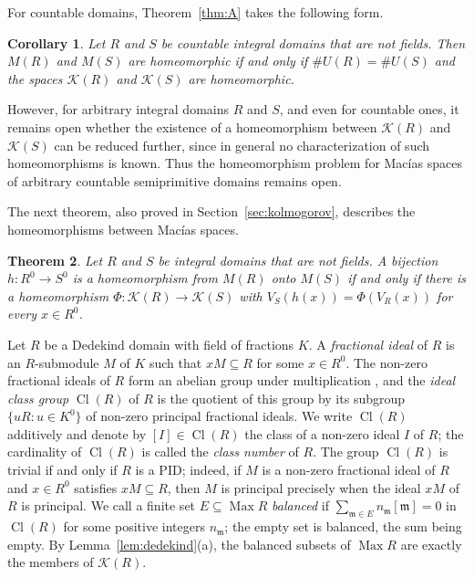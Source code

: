 \documentclass[12pt,reqno,a4paper]{amsart}
\newcommand{\K}{\mathcal{K}}
\newcommand{\m}{\mathfrak{m}}
\DeclareMathOperator{\Max}{Max}
\DeclareMathOperator{\Cl}{Cl}
\theoremstyle{plain}
\newtheorem{theorem}{Theorem}[section]
\newtheorem{corollary}[theorem]{Corollary}
\theoremstyle{definition}
\begin{document}
For countable domains, Theorem~\ref{thm:A} takes the following form.

\begin{corollary}\label{cor:countableK}
Let $R$ and $S$ be countable integral domains that are not fields. Then $M(R)$ and $M(S)$ are homeomorphic if and only if $\#U(R)=\#U(S)$ and the spaces $\K(R)$ and $\K(S)$ are homeomorphic.
\end{corollary}

However, for arbitrary integral domains $R$ and $S$, and even for countable ones, it remains open whether the existence of a homeomorphism between $\K(R)$ and $\K(S)$ can be reduced further, since in general no characterization of such homeomorphisms is known. Thus the homeomorphism problem for Mac\'ias spaces of arbitrary countable semiprimitive domains remains open.

The next theorem, also proved in Section~\ref{sec:kolmogorov}, describes the homeomorphisms between Mac\'ias spaces.

\begin{theorem}\label{cor:homeo}
Let $R$ and $S$ be integral domains that are not fields. A bijection $h\colon R^0\to S^0$ is a homeomorphism from $M(R)$ onto $M(S)$ if and only if there is a homeomorphism $\Phi\colon\K(R)\to\K(S)$ with $V_S(h(x))=\Phi(V_R(x))$ for every $x\in R^0$.
\end{theorem}

Let $R$ be a Dedekind domain with field of fractions $K$. A \emph{fractional ideal} of $R$ is an $R$-submodule $M$ of $K$ such that $xM\subseteq R$ for some $x\in R^0$. The non-zero fractional ideals of $R$ form an abelian group under multiplication \cite[p.~98]{AtiyahMacdonald}, and the \emph{ideal class group} $\Cl(R)$ of $R$ is the quotient of this group by its subgroup $\{uR:u\in K^0\}$ of non-zero principal fractional ideals. We write $\Cl(R)$ additively and denote by $[I]\in\Cl(R)$ the class of a non-zero ideal $I$ of $R$; the cardinality of $\Cl(R)$ is called the \emph{class number} of $R$. The group $\Cl(R)$ is trivial if and only if $R$ is a PID; indeed, if $M$ is a non-zero fractional ideal of $R$ and $x\in R^0$ satisfies $xM\subseteq R$, then $M$ is principal precisely when the ideal $xM$ of $R$ is principal. We call a finite set $E\subseteq\Max R$ \emph{balanced} if $\sum\limits_{\m\in E}n_\m[\m]=0$ in $\Cl(R)$ for some positive integers $n_\m$; the empty set is balanced, the sum being empty. By Lemma~\ref{lem:dedekind}(a), the balanced subsets of $\Max R$ are exactly the members of $\K(R)$.
\end{document}

